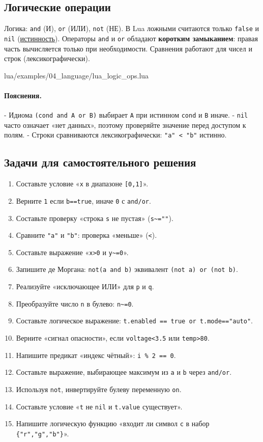 \subsection{Логические операции}
Логика: \verb|and| (И), \verb|or| (ИЛИ), \verb|not| (НЕ). В Lua ложными считаются только \verb|false| и \verb|nil| (\hyperlink{term:truthiness}{истинность}). Операторы \verb|and| и \verb|or| обладают \textbf{коротким замыканием}: правая часть вычисляется только при необходимости. Сравнения работают для чисел и строк (лексикографически).
\begin{codefile}{lua/examples/04_language/lua_logic_ops.lua}
\end{codefile}
\paragraph{Пояснения.}
- Идиома \verb|(cond and A or B)| выбирает \verb|A| при истинном \verb|cond| и \verb|B| иначе.
- \verb|nil| часто означает «нет данных», поэтому проверяйте значение перед доступом к полям.
- Строки сравниваются лексикографически: \verb|"a" < "b"| истинно.
\subsection*{Задачи для самостоятельного решения}
\begin{enumerate}
  \item Составьте условие «\verb|x| в диапазоне \verb|[0,1]|».
  \item Верните \verb|1| если \verb|b==true|, иначе \verb|0| с \verb|and/or|.
  \item Составьте проверку «строка \verb|s| не пустая» (\verb|s~=""|).
  \item Сравните \verb|"a"| и \verb|"b"|: проверка «меньше» (\verb|<|).
  \item Составьте выражение «\verb|x>0| и \verb|y~=0|».
  \item Запишите де Моргана: \verb|not(a and b)| эквивалент \verb|(not a) or (not b)|.
  \item Реализуйте «исключающее ИЛИ» для \verb|p| и \verb|q|.
  \item Преобразуйте число \verb|n| в булево: \verb|n~=0|.
  \item Составьте логическое выражение: \verb|t.enabled == true or t.mode=="auto"|.
  \item Верните «сигнал опасности», если \verb|voltage<3.5| или \verb|temp>80|.
  \item Напишите предикат «индекс чётный»: \verb|i % 2 == 0|.
  \item Составьте выражение, выбирающее максимум из \verb|a| и \verb|b| через \verb|and/or|.
  \item Используя \verb|not|, инвертируйте булеву переменную \verb|on|.
  \item Составьте условие «\verb|t| не \verb|nil| и \verb|t.value| существует».
  \item Напишите логическую функцию «входит ли символ \verb|c| в набор \verb|{"r","g","b"}|».
\end{enumerate}
